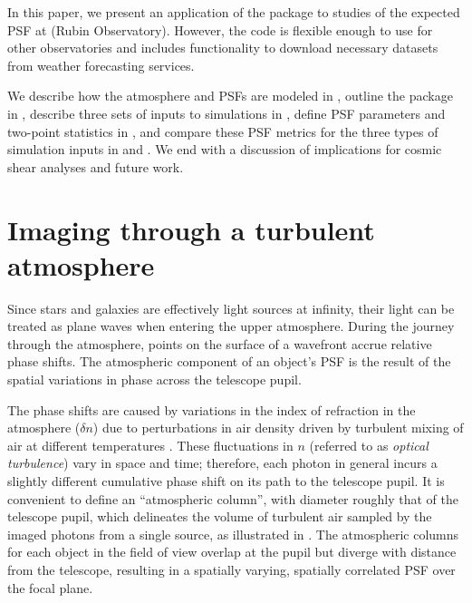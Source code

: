 \documentclass[twocolumn,twocolappendix]{openjournal}
\begin{document}
In this paper, we present an application of the \psfws package to studies of the expected PSF at \cp (Rubin Observatory). 
However, the code is flexible enough to use for other observatories and includes functionality to download necessary datasets from weather forecasting services.

We describe how the atmosphere and PSFs are modeled in , outline the \psfws package in , describe three sets of inputs to simulations in , define PSF parameters and two-point statistics in , and compare these PSF metrics for the three types of simulation inputs in and .
We end with a discussion of implications for cosmic shear analyses and future work. 

\section{Imaging through a turbulent atmosphere} \label{sec:atmos}
Since stars and galaxies are effectively light sources at infinity, their light can be treated as plane waves when entering the upper atmosphere. 
During the journey through the atmosphere, points on the surface of a wavefront accrue relative phase shifts.
The atmospheric component of an object's PSF is the result of the spatial variations in phase across the telescope pupil.

The phase shifts are caused by variations in the index of refraction in the atmosphere ($\delta n$) due to perturbations in air density driven by turbulent mixing of air at different temperatures  \citep{lawrence_survey_1970, clifford_classical_1978}.
These fluctuations in $n$ (referred to as \textit{optical turbulence}) vary in space and time; therefore, each photon in general incurs a slightly different cumulative phase shift on its path to the telescope pupil.
It is convenient to define an ``atmospheric column'', with diameter roughly that of the telescope pupil, which delineates the volume of turbulent air sampled by the imaged photons from a single source, as illustrated in . 
The atmospheric columns for each object in the field of view overlap at the pupil but diverge with distance from the telescope, resulting in a spatially varying, spatially correlated PSF over the focal plane. 
\end{document}
